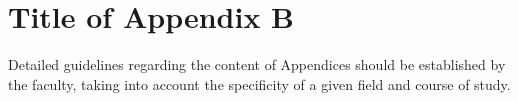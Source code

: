 \chapter[]{Title of Appendix B}

Detailed guidelines regarding the content of Appendices should be established by the faculty, taking into account the specificity of a given field and course of study.